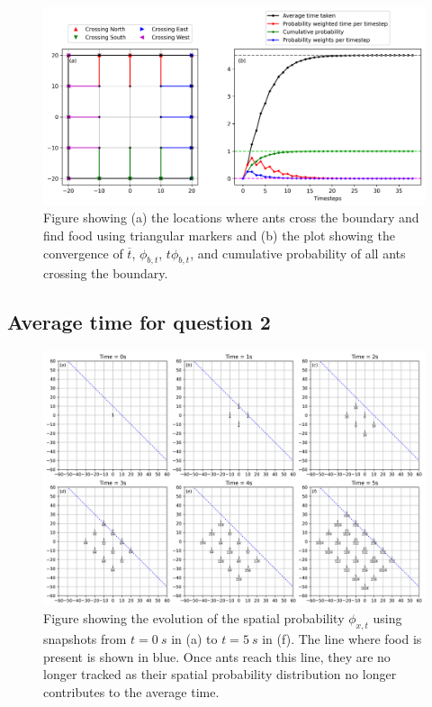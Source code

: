 \documentclass[11pt, a4paper]{article}
\begin{document}
\begin{figure}
    \includegraphics[width=\textwidth]{../Code/question1.png}
    \caption{Figure showing (a) the locations where ants cross the boundary and find food using triangular markers and (b) the plot showing the convergence of $\overline{t}$, $\phi_{b,t}$, $t\phi_{b,t}$, and cumulative probability of all ants crossing the boundary.}
    \label{que1}
\end{figure}

\subsection{Average time for question 2}

\begin{figure}
    \includegraphics[width=\textwidth]{../Code/fig3.png}
    \caption{Figure showing the evolution of the spatial probability $\phi_{x,t}$ using snapshots from $t=\SI{0}{s}$ in (a) to $t=\SI{5}{s}$ in (f). The line where food is present is shown in blue. Once ants reach this line, they are no longer tracked as their spatial probability distribution no longer contributes to the average time.}
    \label{fig3}
\end{figure}
\end{document}
